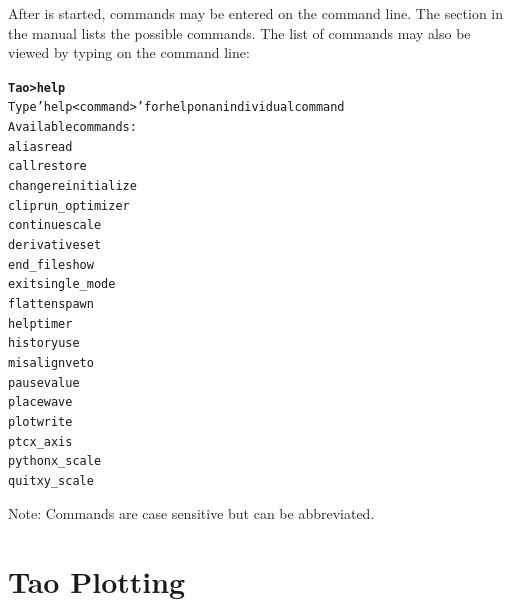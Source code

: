 \documentclass{hitec}
\newcommand{\BF}[1]{{\normalfont\textbf{#1}}}
\newenvironment{display}
  {\vspace*{-1.5ex} \begin{alltt}}
  {\end{alltt} \vspace*{-1.0ex}}
\begin{document}
After \tao is started, commands may be entered on the command line. The section
\tao {} in the \tao manual lists the possible commands. The list
of commands may also be viewed by typing  on the command line:
\begin{display}
  \BF{Tao> help}
  Type 'help <command>' for help on an individual command
  Available commands:
    alias                             read
    call                              restore
    change                            reinitialize
    clip                              run_optimizer
    continue                          scale
    derivative                        set
    end_file                          show
    exit                              single_mode
    flatten                           spawn
    help                              timer
    history                           use
    misalign                          veto
    pause                             value
    place                             wave
    plot                              write
    ptc                               x_axis
    python                            x_scale
    quit                              xy_scale
\end{display}
Note: Commands are case sensitive but can be abbreviated.

\section{Tao Plotting}
\end{document}
